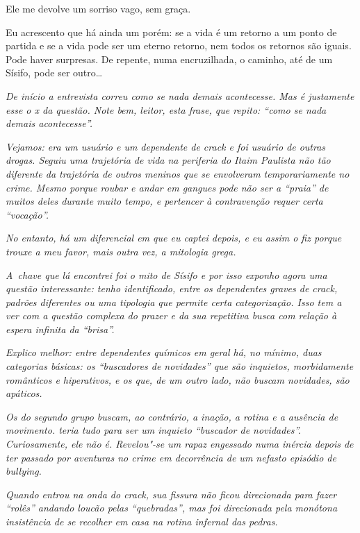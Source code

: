 Ele me devolve um sorriso vago, sem graça.

Eu acrescento que há ainda um porém: se a vida é um retorno a um ponto
de partida e se a vida pode ser um eterno retorno, nem todos os retornos
são iguais. Pode haver surpresas. De repente, numa encruzilhada, o
caminho, até de um Sísifo, pode ser outro…

\begin{center}\asterisc{}\end{center}


\emph{De início a entrevista correu como se nada demais acontecesse. Mas
é justamente esse o x da questão. Note bem, leitor, esta frase, que
repito: ``como se nada demais acontecesse''.}~

\emph{Vejamos:  era um usuário e um dependente de crack e foi usuário
de outras drogas. Seguiu uma trajetória de vida na periferia do Itaim
Paulista não tão diferente da trajetória de outros meninos que se
envolveram temporariamente no crime. Mesmo porque roubar e andar em
gangues pode não ser a ``praia'' de muitos deles durante muito tempo, e
pertencer à contravenção requer certa ``vocação''.}~

\emph{No entanto, há um diferencial em  que eu captei depois, e eu
assim o fiz porque trouxe a meu favor, mais outra vez, a mitologia
grega.}~

\emph{A~chave que lá encontrei foi o mito de Sísifo e por isso exponho
agora uma questão interessante: tenho identificado, entre os dependentes
graves de crack, padrões diferentes ou uma tipologia que permite certa
categorização. Isso tem a ver com a questão complexa do prazer e da sua
repetitiva busca com relação à espera infinita da ``brisa''.}~

\emph{Explico melhor: entre dependentes químicos em geral há, no mínimo,
duas categorias básicas: os ``buscadores de novidades'' que são
inquietos, morbidamente românticos e hiperativos, e os que, de um outro
lado, não buscam novidades, são apáticos.}~

\emph{Os do segundo grupo buscam, ao contrário, a inação, a rotina e a
ausência de movimento.  teria tudo para ser um inquieto ``buscador de
novidades''. Curiosamente, ele não é. Revelou"-se um rapaz engessado numa
inércia depois de ter passado por aventuras no crime em decorrência de
um nefasto episódio de bullying.}~

\emph{Quando  entrou na onda do crack, sua fissura não ficou
direcionada para fazer ``rolês'' andando loucão pelas ``quebradas'', mas
foi direcionada pela monótona insistência de se recolher em casa na
rotina infernal das pedras.}~

